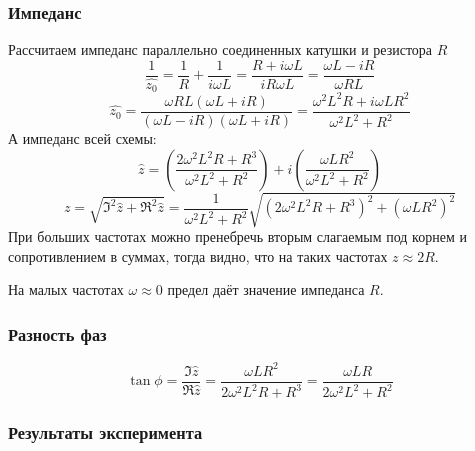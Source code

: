 \subsubsection{Импеданс}
Рассчитаем импеданс параллельно соединенных катушки и резистора $R$
\begin{equation}
	\frac{1}{\hat{z_0}}=\frac{1}{R}+\frac{1}{i\omega L}=\frac{R+i\omega L}{iR\omega L}=\frac{\omega L - iR}{\omega R L}
\end{equation}
\begin{equation}
	\hat{z_0}=\frac{\omega R L(\omega L + iR)}{(\omega L - iR)(\omega L + iR)}=
	\frac{\omega^2L^2 R +i\omega L R^2}{\omega^2L^2+R^2}
\end{equation}
А импеданс всей схемы:
\begin{equation}
	\hat{z}=
	\left(
	\frac{2\omega^2L^2 R+R^3}{\omega^2L^2+R^2}
	\right)+
	i
	\left(
	\frac{\omega L R^2}{\omega^2L^2+R^2}
	\right)
\end{equation}
\begin{equation}
	z=\sqrt{\Im^2\hat{z}+\Re^2\hat{z}}=
	\frac{1}{\omega^2L^2+R^2}\sqrt{
		\left(
		2\omega^2L^2 R+R^3
		\right)^2+
		\left(
		\omega L R^2
		\right)^2
	}
\end{equation}
При больших частотах можно пренебречь вторым слагаемым под корнем и сопротивлением в суммах, тогда видно, что на таких частотах $z\approx 2R$.

На малых частотах $\omega\approx0$ предел даёт значение импеданса $R$.
\subsubsection{Разность фаз}
\begin{equation}
	\tan\phi = \frac{\Im\hat{z}}{\Re\hat{z}}=
	\frac{
		\omega L R^2
	}{
		2\omega^2L^2 R+R^3
	}=
	\frac{
		\omega LR
	}{
		2\omega^2L^2 +R^2
	}
\end{equation}

\subsubsection{Результаты эксперимента}

